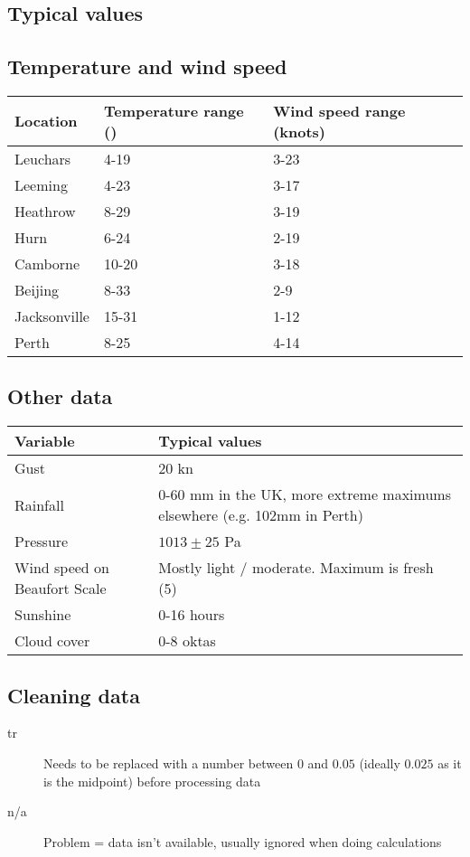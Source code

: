 \subsection{Typical values}
\subsection*{Temperature and wind speed}
\begin{tabular}{|l|l|l|}
	\hline
	\textbf{Location} & \textbf{Temperature range (\textcelsius)}& \textbf{Wind speed range (knots)} \\
	\hline
	Leuchars & 4-19 & 3-23 \\
	\hline
	Leeming & 4-23 & 3-17 \\
	\hline
	Heathrow & 8-29 & 3-19 \\
	\hline
	Hurn & 6-24 & 2-19 \\
	\hline
	Camborne & 10-20 & 3-18 \\
	\hline
	Beijing & 8-33 & 2-9 \\
	\hline
	Jacksonville & 15-31 & 1-12 \\
	\hline
	Perth & 8-25 & 4-14 \\
	\hline
\end{tabular}

\subsection*{Other data}
\begin{tabular}{|p{4.8cm} | p{12.2cm}|}
	\hline
	\textbf{Variable} & \textbf{Typical values} \\
	\hline
	Gust & 20 kn \\
	\hline
	Rainfall & 0-60 mm in the UK, more extreme maximums elsewhere (e.g. 102mm in Perth) \\
	\hline
	Pressure & $1013 \pm 25$ Pa \\
	\hline
	Wind speed on Beaufort Scale & Mostly light / moderate. Maximum is fresh (5) \\
	\hline
	Sunshine & 0-16 hours \\
	\hline
	Cloud cover & 0-8 oktas \\
	\hline
\end{tabular}

\subsection{Cleaning data}
\begin{description}
	\item[tr] Needs to be replaced with a number between $0$ and $0.05$ (ideally $0.025$ as it is the midpoint) before processing data
	\item[n/a] Problem = data isn't available, usually ignored when doing calculations
\end{description}




